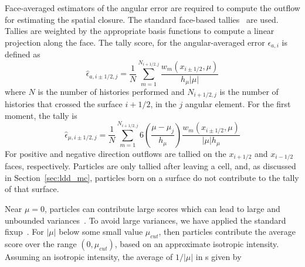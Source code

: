 Face-averaged estimators of the angular error are required to compute the outflow for
estimating the spatial closure. The standard face-based
tallies~\cite{shultis_mc,favorite_faces} are used.  Tallies are weighted by
the appropriate basis functions to compute a linear projection along the face.  The
tally score, for the angular-averaged error $\epsilon_{a,i}$ is defined as
\begin{equation}
    \hat \epsilon_{a,i\pm1/2,j} = \frac{1}{N} \sum_{m=1}^{N_{i+1/2,j}}
    \frac{w_m(x_{i\pm1/2},\mu)}{h_{\mu} |\mu|}
\end{equation}
where $N$ is the number of histories performed and $N_{i+1/2,j}$ is the number of histories
that crossed the surface $i+1/2$, in the $j$ angular element.   For the first
moment, the tally is
\begin{equation}
    \hat \epsilon_{\mu,i\pm1/2,j} = \frac{1}{N} \sum_{m=1}^{N_{i+1/2,j}} 
    6\left(\frac{\mu-\mu_j}{h_\mu}\right) \frac{w_m(x_{i\pm1/2},\mu)}{|\mu| h_{\mu}}
\end{equation}
For positive and negative direction outflows are tallied
on the $x_{i+1/2}$ and $x_{i-1/2}$ faces, respectively. Particles are only tallied after leaving
a cell, and, as discussed in Section~\ref{sec:ldd_mc}, particles born on a surface do not contribute
to the tally of that surface.

Near $\mu=0$, particles can contribute large scores which can lead to large and
unbounded variances~\cite{favorite_faces}.  To avoid large variances, we have applied the standard fixup~\cite{mcnp,favorite_faces}.  
For $|\mu|$ below some small value $\mu_{cut}$, then 
particles contribute the average score over the range $(0,\mu_{cut})$, based on an
approximate isotropic intensity.  Assuming an isotropic intensity, the average of
$1/|\mu|$ in s given by
\begin{equation}

\end{equation}


